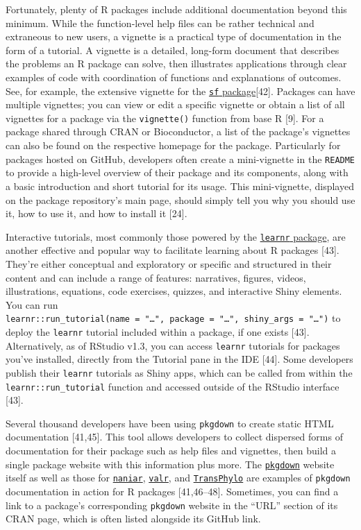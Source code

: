 \documentclass[10pt,letterpaper]{article}
\begin{document}
Fortunately, plenty of R packages include additional documentation
beyond this minimum. While the function-level help files can be rather
technical and extraneous to new users, a vignette is a practical type of
documentation in the form of a tutorial. A vignette is a detailed,
long-form document that describes the problems an R package can solve,
then illustrates applications through clear examples of code with
coordination of functions and explanations of outcomes. See, for
example, the extensive vignette for the
\href{https://cran.r-project.org/web/packages/sf/vignettes/sf1.html}{\texttt{sf}
package}{[}42{]}. Packages can have multiple vignettes; you can view or
edit a specific vignette or obtain a list of all vignettes for a package
via the \texttt{vignette()} function from base R {[}9{]}. For a package
shared through CRAN or Bioconductor, a list of the package's vignettes
can also be found on the respective homepage for the package.
Particularly for packages hosted on GitHub, developers often create a
mini-vignette in the \texttt{README} to provide a high-level overview of
their package and its components, along with a basic introduction and
short tutorial for its usage. This mini-vignette, displayed on the
package repository's main page, should simply tell you why you should
use it, how to use it, and how to install it {[}24{]}.

Interactive tutorials, most commonly those powered by the
\href{https://rstudio.github.io/learnr/}{\texttt{learnr} package}, are
another effective and popular way to facilitate learning about R
packages {[}43{]}. They're either conceptual and exploratory or specific
and structured in their content and can include a range of features:
narratives, figures, videos, illustrations, equations, code exercises,
quizzes, and interactive Shiny elements. You can run
\texttt{learnr::run\_tutorial(name\ =\ "\ldots{}",\ package\ =\ "\ldots{}",\ shiny\_args\ =\ "\ldots{}")}
to deploy the \texttt{learnr} tutorial included within a package, if one
exists {[}43{]}. Alternatively, as of RStudio v1.3, you can access
\texttt{learnr} tutorials for packages you've installed, directly from
the Tutorial pane in the IDE {[}44{]}. Some developers publish their
\texttt{learnr} tutorials as Shiny apps, which can be called from within
the \texttt{learnr::run\_tutorial} function and accessed outside of the
RStudio interface {[}43{]}.

Several thousand developers have been using \texttt{pkgdown} to create
static HTML documentation {[}41,45{]}. This tool allows developers to
collect dispersed forms of documentation for their package such as help
files and vignettes, then build a single package website with this
information plus more. The
\href{https://pkgdown.r-lib.org/}{\texttt{pkgdown}} website itself as
well as those for
\href{http://naniar.njtierney.com/index.html}{\texttt{naniar}},
\href{https://rnabioco.github.io/valr/}{\texttt{valr}}, and
\href{https://xavierdidelot.github.io/TransPhylo/articles/TransPhylo.html}{\texttt{TransPhylo}}
are examples of \texttt{pkgdown} documentation in action for R packages
{[}41,46--48{]}. Sometimes, you can find a link to a package's
corresponding \texttt{pkgdown} website in the ``URL'' section of its
CRAN page, which is often listed alongside its GitHub link.
\end{document}
